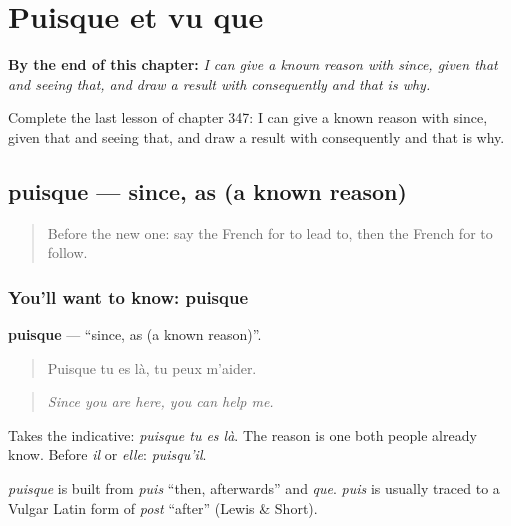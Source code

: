 
\chapter{Puisque et vu que}
\label{ch:fr-puisque-et-vu-que}

\begin{chapteropening}
\textbf{By the end of this chapter:} \emph{I can give a known reason with since, given that and seeing that, and draw a result with consequently and that is why.}

Complete the last lesson of chapter 347: I can give a known reason with since, given that and seeing that, and draw a result with consequently and that is why.
\end{chapteropening}

\section[puisque]{puisque — since, as (a known reason)}

\label{lesson:FR-C347-puisque}



\begin{quote}
Before the new one: say the French for to lead to, then the French for to follow.
\end{quote}

\subsection*{You'll want to know: puisque}
\textbf{puisque} — \textquotedblleft{}since, as (a known reason)\textquotedblright{}.

\begin{quote}
Puisque tu es là, tu peux m'aider.
\end{quote}

\begin{quote}
\emph{Since you are here, you can help me.}
\end{quote}

Takes the indicative: \emph{puisque tu es là}. The reason is one both people already know. Before \emph{il} or \emph{elle}: \emph{puisqu'il}.

\begin{cousinweb}
\emph{puisque} is built from \emph{puis} \textquotedblleft{}then, afterwards\textquotedblright{} and \emph{que}. \emph{puis} is usually traced to a Vulgar Latin form of \emph{post} \textquotedblleft{}after\textquotedblright{} (Lewis \& Short).
\end{cousinweb}

